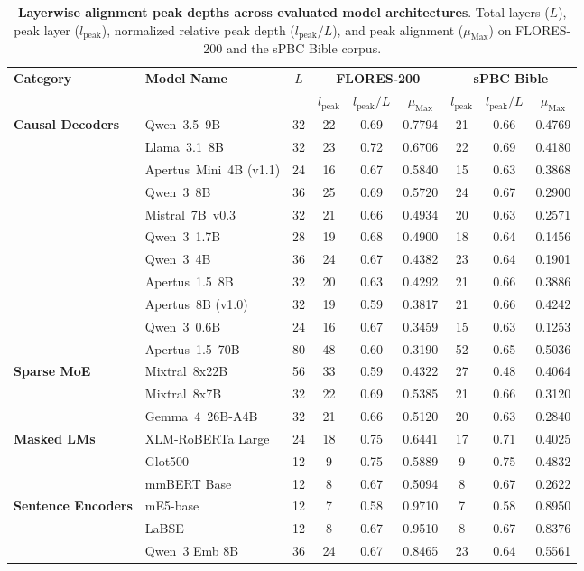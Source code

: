 \begin{table}[H]
\centering
\footnotesize
\setlength{\tabcolsep}{4.5pt}
\begin{tabular}{@{}llccccccc@{}}
\toprule
\multirow{2}{*}{\textbf{Category}} & \multirow{2}{*}{\textbf{Model Name}} & \multirow{2}{*}{$L$} & \multicolumn{3}{c}{\textbf{FLORES-200}} & \multicolumn{3}{c}{\textbf{sPBC Bible}} \\
\cmidrule(lr){4-6} \cmidrule(lr){7-9}
& & & $l_{\text{peak}}$ & $l_{\text{peak}}/L$ & $\mu_{\text{Max}}$ & $l_{\text{peak}}$ & $l_{\text{peak}}/L$ & $\mu_{\text{Max}}$ \\
\midrule
\textbf{Causal Decoders} 
  & Qwen~3.5~9B & 32 & 22 & 0.69 & 0.7794 & 21 & 0.66 & 0.4769 \\
  & Llama~3.1~8B & 32 & 23 & 0.72 & 0.6706 & 22 & 0.69 & 0.4180 \\
  & Apertus~Mini~4B (v1.1) & 24 & 16 & 0.67 & 0.5840 & 15 & 0.63 & 0.3868 \\
  & Qwen~3~8B & 36 & 25 & 0.69 & 0.5720 & 24 & 0.67 & 0.2900 \\
  & Mistral~7B~v0.3 & 32 & 21 & 0.66 & 0.4934 & 20 & 0.63 & 0.2571 \\
  & Qwen~3~1.7B & 28 & 19 & 0.68 & 0.4900 & 18 & 0.64 & 0.1456 \\
  & Qwen~3~4B & 36 & 24 & 0.67 & 0.4382 & 23 & 0.64 & 0.1901 \\
  & Apertus~1.5~8B & 32 & 20 & 0.63 & 0.4292 & 21 & 0.66 & 0.3886 \\
  & Apertus~8B (v1.0) & 32 & 19 & 0.59 & 0.3817 & 21 & 0.66 & 0.4242 \\
  & Qwen~3~0.6B & 24 & 16 & 0.67 & 0.3459 & 15 & 0.63 & 0.1253 \\
  & Apertus~1.5~70B & 80 & 48 & 0.60 & 0.3190 & 52 & 0.65 & 0.5036 \\
\midrule
\textbf{Sparse MoE} 
  & Mixtral~8x22B & 56 & 33 & 0.59 & 0.4322 & 27 & 0.48 & 0.4064 \\
  & Mixtral~8x7B & 32 & 22 & 0.69 & 0.5385 & 21 & 0.66 & 0.3120 \\
  & Gemma~4~26B-A4B & 32 & 21 & 0.66 & 0.5120 & 20 & 0.63 & 0.2840 \\
\midrule
\textbf{Masked LMs} 
  & XLM-RoBERTa Large & 24 & 18 & 0.75 & 0.6441 & 17 & 0.71 & 0.4025 \\
  & Glot500 & 12 & 9 & 0.75 & 0.5889 & 9 & 0.75 & 0.4832 \\
  & mmBERT Base & 12 & 8 & 0.67 & 0.5094 & 8 & 0.67 & 0.2622 \\
\midrule
\textbf{Sentence Encoders} 
  & mE5-base & 12 & 7 & 0.58 & 0.9710 & 7 & 0.58 & 0.8950 \\
  & LaBSE & 12 & 8 & 0.67 & 0.9510 & 8 & 0.67 & 0.8376 \\
  & Qwen~3 Emb 8B & 36 & 24 & 0.67 & 0.8465 & 23 & 0.64 & 0.5561 \\
\bottomrule
\end{tabular}
\caption{\textbf{Layerwise alignment peak depths across evaluated model architectures}. Total layers ($L$), peak layer ($l_{\text{peak}}$), normalized relative peak depth ($l_{\text{peak}}/L$), and peak alignment ($\mu_{\text{Max}}$) on FLORES-200 and the sPBC Bible corpus.}
\label{tab:appendix-layer-depths}
\end{table}
